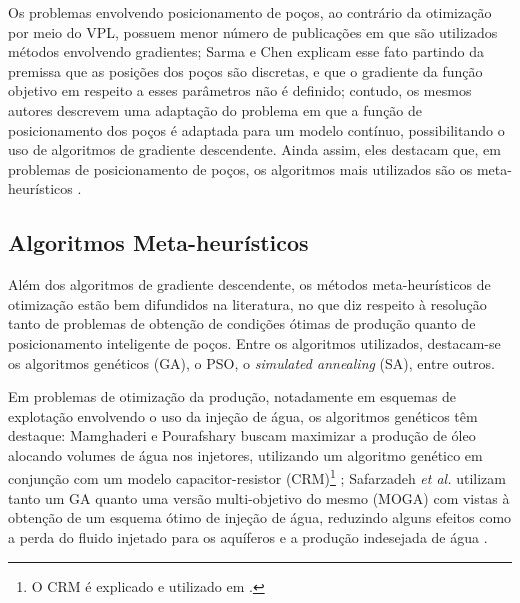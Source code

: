 Os problemas envolvendo posicionamento de po\c{c}os, ao contr\'{a}rio da otimiza\c{c}\~{a}o por meio do VPL, possuem menor n\'{u}mero de publica\c{c}\~{o}es em que s\~{a}o utilizados m\'{e}todos envolvendo gradientes; Sarma e Chen explicam esse fato partindo da premissa que as posi\c{c}\~{o}es dos po\c{c}os s\~{a}o discretas, e que o gradiente da fun\c{c}\~{a}o objetivo em respeito a esses par\^{a}metros n\~{a}o \'{e} definido; contudo, os mesmos autores descrevem uma adapta\c{c}\~{a}o do problema em que a fun\c{c}\~{a}o de posicionamento dos po\c{c}os \'{e} adaptada para um modelo cont\'{i}nuo, possibilitando o uso de algoritmos de gradiente descendente. Ainda assim, eles destacam que, em problemas de posicionamento de po\c{c}os, os algoritmos mais utilizados s\~{a}o os meta-heur\'{i}sticos \cite{sarmaChen}.


\subsection{Algoritmos Meta-heur\'{i}sticos}
Al\'{e}m dos algoritmos de gradiente descendente, os m\'{e}todos meta-heur\'{i}sticos de otimiza\c{c}\~{a}o est\~{a}o bem difundidos na literatura, no que diz respeito \`{a} resolu\c{c}\~{a}o tanto de problemas de obten\c{c}\~{a}o de condi\c{c}\~{o}es \'{o}timas de produ\c{c}\~{a}o quanto de posicionamento inteligente de po\c{c}os. Entre os algoritmos utilizados, destacam-se os algoritmos gen\'{e}ticos (GA), o PSO, o \textit{simulated annealing} (SA), entre outros.

Em problemas de otimiza\c{c}\~{a}o da produ\c{c}\~{a}o, notadamente em esquemas de explota\c{c}\~{a}o envolvendo o uso da inje\c{c}\~{a}o de \'{a}gua, os algoritmos gen\'{e}ticos t\^{e}m destaque: Mamghaderi e Pourafshary buscam maximizar a produ\c{c}\~{a}o de \'{o}leo alocando volumes de \'{a}gua nos injetores, utilizando um algoritmo gen\'{e}tico em conjun\c{c}\~{a}o com um modelo capacitor-resistor (CRM)\footnote{O CRM \'{e} explicado e utilizado em \cite{SAYARPOUR2009227}.} \cite{MAMGHADERI2013107}; Safarzadeh \textit{et al.} utilizam tanto um GA quanto uma vers\~{a}o multi-objetivo do mesmo (MOGA) com vistas \`{a} obten\c{c}\~{a}o de um esquema \'{o}timo de inje\c{c}\~{a}o de \'{a}gua, reduzindo alguns efeitos como a perda do fluido injetado para os aqu\'{i}feros e a produ\c{c}\~{a}o indesejada de \'{a}gua \cite{Safarzadeh2015}.

